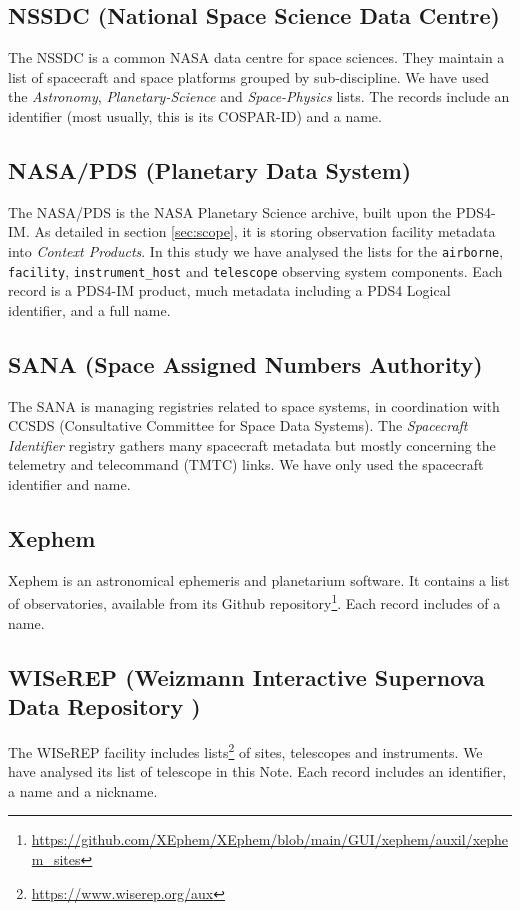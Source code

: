 \documentclass[11pt,a4paper]{ivoa}
\begin{document}
\subsection{NSSDC (National Space Science Data Centre)}
The NSSDC is a common NASA data centre for space sciences. They maintain a
list of spacecraft and space platforms grouped by sub-discipline. We have
used the \emph{Astronomy}, \emph{Planetary-Science} and \emph{Space-Physics}
lists. The records include an identifier (most usually, this is its
COSPAR-ID) and a name.

\subsection{NASA/PDS (Planetary Data System)}
The NASA/PDS is the NASA Planetary Science archive, built upon the
PDS4-IM. As detailed in section \ref{sec:scope}, it is storing
observation facility metadata into \emph{Context Products}. In this
study we have analysed the lists for the
\texttt{airborne}, \texttt{facility},
\texttt{instrument\_host} and \texttt{telescope}
observing system components. Each record is
a PDS4-IM product, much metadata including a PDS4 Logical
identifier, and a full name.

\subsection{SANA (Space Assigned Numbers Authority)}
The SANA is managing registries related to space systems, in
coordination with CCSDS (Consultative Committee for Space Data
Systems). The \emph{Spacecraft Identifier} registry gathers many
spacecraft metadata but mostly concerning the telemetry and
telecommand (TMTC) links. We have only used the
spacecraft identifier and name.

\subsection{Xephem}
Xephem is an astronomical ephemeris and planetarium software. It
contains a list of observatories, available from its Github
repository\footnote{\url{https://github.com/XEphem/XEphem/blob/main/GUI/xephem/auxil/xephem_sites}}.
Each record includes of a name.

\subsection{WISeREP (Weizmann Interactive Supernova Data Repository )}
The WISeREP facility includes lists\footnote{\url{https://www.wiserep.org/aux}}
of sites, telescopes and instruments. We have analysed its list of telescope
in this Note. Each record includes an identifier, a name and a
nickname.
\end{document}
